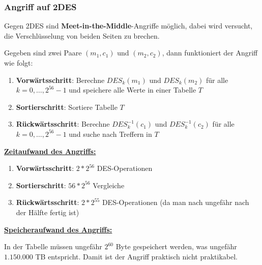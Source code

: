 \documentclass[12pt,A4]{extarticle}
\begin{document}
\subsubsection{Angriff auf 2DES}
Gegen 2DES sind \textbf{Meet-in-the-Middle}-Angriffe möglich, dabei wird versucht, die Verschlüsselung von beiden Seiten zu brechen.\par
Gegeben sind zwei Paare $(m_1, c_1)$ und $(m_2, c_2)$, dann funktioniert der Angriff wie folgt:
\begin{enumerate}
  \item{\textbf{Vorwärtsschritt}: Berechne $DES_{k}(m_1)$ und $DES_{k}(m_2)$ für alle $k = 0, \dots, 2^{56} - 1$ und speichere alle Werte in einer Tabelle $T$}
  \item{\textbf{Sortierschritt}: Sortiere Tabelle $T$}
  \item{\textbf{Rückwärtsschritt}: Berechne $DES^{-1}_{k}(c_1)$ und $DES^{-1}_{k}(c_2)$ für alle $k = 0, \dots, 2^{56} - 1$ und suche nach Treffern in $T$}
\end{enumerate}
\underline{\textbf{Zeitaufwand des Angriffs:}}
\begin{enumerate}
  \item{\textbf{Vorwärtsschritt}: $2 * 2^{56}$ DES-Operationen}
  \item{\textbf{Sortierschritt}: $56 * 2^{56}$ Vergleiche}
  \item{\textbf{Rückwärtsschritt}: $2 * 2^{55}$ DES-Operationen (da man nach ungefähr nach der Hälfte fertig ist)}
\end{enumerate}
\underline{\textbf{Speicheraufwand des Angriffs:}}\par
In der Tabelle müssen ungefähr $2^{60}$ Byte gespeichert werden, was ungefähr $1.150.000$ TB entspricht. Damit ist der Angriff praktisch nicht praktikabel.
\end{document}
